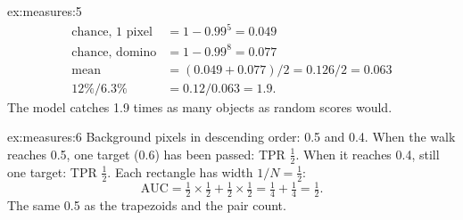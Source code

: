 \begin{solution}{ex:measures:5}
\begin{align*}
\text{chance, 1 pixel} &= 1 - 0.99^5 = 0.049\\
\text{chance, domino} &= 1 - 0.99^8 = 0.077\\
\text{mean} &= (0.049 + 0.077)/2 = 0.126/2 = 0.063\\
12\% / 6.3\% &= 0.12 / 0.063 = 1.9.
\end{align*}
The model catches 1.9 times as many objects as random scores would.
\end{solution}

\begin{solution}{ex:measures:6}
Background pixels in descending order: 0.5 and 0.4. When the walk reaches 0.5, one target (0.6) has been passed:
TPR $\frac12$. When it reaches 0.4, still one target: TPR $\frac12$. Each rectangle has width $1/N = \frac12$:
\[
\text{AUC} = \tfrac12 \times \tfrac12 + \tfrac12 \times \tfrac12 = \tfrac14 + \tfrac14 = \tfrac12.
\]
The same 0.5 as the trapezoids and the pair count.
\end{solution}

